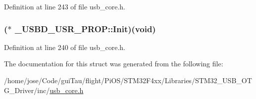 Definition at line 243 of file usb\-\_\-core.\-h.

\hypertarget{struct___u_s_b_d___u_s_r___p_r_o_p_ae47dce58c224e0fd42728a4597eb0d44}{
\subsubsection[{Init}]{($\ast$ \-\_\-\-U\-S\-B\-D\-\_\-\-U\-S\-R\-\_\-\-P\-R\-O\-P\-::\-Init)({\bf void})}}\label{struct___u_s_b_d___u_s_r___p_r_o_p_ae47dce58c224e0fd42728a4597eb0d44}


Definition at line 240 of file usb\-\_\-core.\-h.



The documentation for this struct was generated from the following file\-:\begin{DoxyCompactItemize}
\item 
/home/jose/\-Code/gui\-Tau/flight/\-Pi\-O\-S/\-S\-T\-M32\-F4xx/\-Libraries/\-S\-T\-M32\-\_\-\-U\-S\-B\-\_\-\-O\-T\-G\-\_\-\-Driver/inc/\hyperlink{_s_t_m32_f4xx_2_libraries_2_s_t_m32___u_s_b___o_t_g___driver_2inc_2usb__core_8h}{usb\-\_\-core.\-h}\end{DoxyCompactItemize}
